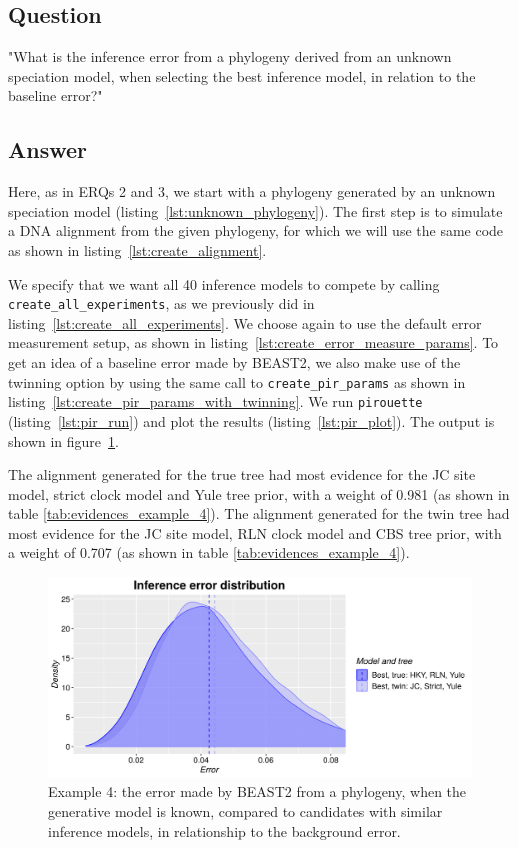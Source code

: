 \documentclass{article}
\begin{document}
\subsection{Question}

"What is the inference error from a phylogeny 
derived from an unknown speciation model,
when selecting the best inference model, 
in relation to the baseline error?"

\subsection{Answer}

Here, as in ERQs 2 and 3, we start with a phylogeny 
generated by an unknown speciation model (listing~\ref{lst:unknown_phylogeny}). 
The first step is to simulate a DNA alignment 
from the given phylogeny, for which we will use the same code 
as shown in listing~\ref{lst:create_alignment}.

We specify that we want all 40 inference models to compete 
by calling \verb;create_all_experiments;,
as we previously did in listing~\ref{lst:create_all_experiments}.
We choose again to use the default error measurement setup,
as shown in listing~\ref{lst:create_error_measure_params}.
To get an idea of a baseline error made by BEAST2, 
we also make use of the twinning option by using
the same call to \verb;create_pir_params; as shown in 
listing~\ref{lst:create_pir_params_with_twinning}.
We run \verb;pirouette; (listing~\ref{lst:pir_run}) 
and plot the results (listing~\ref{lst:pir_plot}).
The output is shown in figure~\ref{fig:example_4}. 

The alignment
generated for the true tree had most evidence for the JC site model,
strict clock model and Yule tree prior, 
with a weight of 0.981 (as 
shown in table \ref{tab:evidences_example_4}). 
The alignment
generated for the twin tree had most evidence for the JC site model,
RLN clock model and CBS tree prior,
with a weight of 0.707 (as 
shown in table \ref{tab:evidences_example_4}). 

\begin{figure}[H]
  \includegraphics[width=\textwidth]{example_4/errors.png}
  \caption{
    Example 4: the error made by BEAST2 from a phylogeny, when the generative 
    model is known, compared to candidates with similar inference models, in 
    relationship to the background error.
  }
  \label{fig:example_4}
\end{figure}
\end{document}
